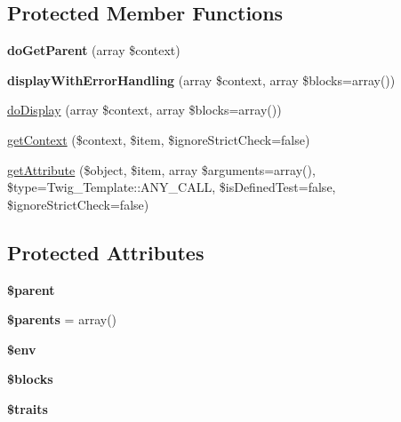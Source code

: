 \subsection*{Protected Member Functions}
\begin{DoxyCompactItemize}
\item 
\hypertarget{class_twig___template_a8a2d1d26863a5dbc3220201cdb4e3b0c}{}{\bfseries do\+Get\+Parent} (array \$context)\label{class_twig___template_a8a2d1d26863a5dbc3220201cdb4e3b0c}

\item 
\hypertarget{class_twig___template_a6e13737c743406fb98c6ac9e00632fd7}{}{\bfseries display\+With\+Error\+Handling} (array \$context, array \$blocks=array())\label{class_twig___template_a6e13737c743406fb98c6ac9e00632fd7}

\item 
\hyperlink{class_twig___template_adb62b7c226e07d30f836ed16158d924f}{do\+Display} (array \$context, array \$blocks=array())
\item 
\hyperlink{class_twig___template_a37b7cef4c38cbf5ee6161263eab83075}{get\+Context} (\$context, \$item, \$ignore\+Strict\+Check=false)
\item 
\hyperlink{class_twig___template_a73808097bd7cf0cceeeae73b71ee8e12}{get\+Attribute} (\$object, \$item, array \$arguments=array(), \$type=Twig\+\_\+\+Template\+::\+A\+N\+Y\+\_\+\+C\+A\+L\+L, \$is\+Defined\+Test=false, \$ignore\+Strict\+Check=false)
\end{DoxyCompactItemize}
\subsection*{Protected Attributes}
\begin{DoxyCompactItemize}
\item 
\hypertarget{class_twig___template_a4e2313a4b35b72a06ac45fd38960f677}{}{\bfseries \$parent}\label{class_twig___template_a4e2313a4b35b72a06ac45fd38960f677}

\item 
\hypertarget{class_twig___template_aaccf6ab4a29a043ae88aa27a3cc974b4}{}{\bfseries \$parents} = array()\label{class_twig___template_aaccf6ab4a29a043ae88aa27a3cc974b4}

\item 
\hypertarget{class_twig___template_aa99ce9ae015e958eef5782267276fbb4}{}{\bfseries \$env}\label{class_twig___template_aa99ce9ae015e958eef5782267276fbb4}

\item 
\hypertarget{class_twig___template_a320aeae1df42ee73ab4b3d9f7cf4ef3f}{}{\bfseries \$blocks}\label{class_twig___template_a320aeae1df42ee73ab4b3d9f7cf4ef3f}

\item 
\hypertarget{class_twig___template_a00d691d7d5290df7d075c00deb62dd1b}{}{\bfseries \$traits}\label{class_twig___template_a00d691d7d5290df7d075c00deb62dd1b}

\end{DoxyCompactItemize}
